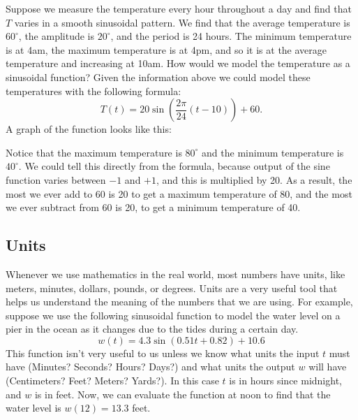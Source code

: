 % 
% 
% 
% 
\bex
Suppose we measure the temperature every hour throughout a day and find that $T$ varies in
a smooth sinusoidal pattern.  We find that the average temperature is $60^\circ$, the
amplitude is $20^\circ$, and the period is 24 hours.  The minimum temperature is at 4am,
the maximum temperature is at 4pm, and so it is at the average temperature and increasing
at 10am.  How would we model the temperature as a sinusoidal function?
\eex
Given the information above we could model these temperatures with the following formula:
\[ T(t) = 20 \sin \left( \frac{2 \pi}{24} (t - 10) \right) + 60. \]
A graph of the function looks like this:
\begin{center}
\end{center}
% 
Notice that the maximum temperature is $80^\circ$ and the minimum temperature is
$40^\circ$.  We could tell this directly from the formula, because output of the sine
function varies between $-1$ and $+1$, and this is multiplied by 20.  As a result, the
most we ever add to 60 is 20 to get a maximum temperature of 80, and the most we ever
subtract from 60 is 20, to get a minimum temperature of 40.

\afterex








\subsection*{Units}

Whenever we use mathematics in the real world, most numbers have units, like meters,
minutes, dollars, pounds, or degrees.  Units are a very useful tool that helps us
understand the meaning of the numbers that we are using.  For example, suppose we use the
following sinusoidal function to model the water level on a pier in the ocean as it
changes due to the tides during a certain day.
\[ w(t) = 4.3 \sin \left( 0.51 t + 0.82 \right) + 10.6 \]
This function isn't very useful to us unless we know what units the input $t$ must have
(Minutes?  Seconds?  Hours?  Days?) and what units the output $w$ will have (Centimeters?
Feet?  Meters?  Yards?).  In this case $t$ is in hours since midnight, and $w$ is in feet.
Now, we can evaluate the function at noon to find that the water level is $w(12) = 13.3$
feet.


